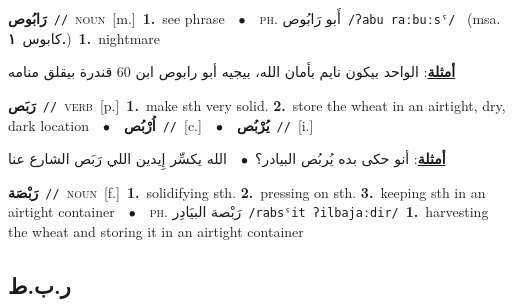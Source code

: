 \documentclass[10pt,a4paper,twoside]{article} %
\begin{document}
\begin{multicols}{2}
{\setlength\topsep{0pt}\textbf{\foreignlanguage{arabic}{رَابُوص}}\ {\color{gray}\texttt{//}\color{black}}\ \textsc{noun}\ [m.]\ \textbf{1.}~see phrase\ \ $\bullet$\ \ \textsc{ph.} \color{gray} \foreignlanguage{arabic}{أَبو رَابُوص}\color{black}\ {\color{gray}\texttt{/{\sffamily ʔabu raːbuːsˤ}/}\color{black}}\ \color{gray} (msa. \foreignlanguage{arabic}{كابوس}~\foreignlanguage{arabic}{\textbf{١.}})\color{black}\ \textbf{1.}~nightmare\  \begin{flushright}\color{gray}\foreignlanguage{arabic}{\textbf{\underline{\foreignlanguage{arabic}{أمثلة}}}: الواحد بيكون نايم بأمان الله، بيجيه أبو رابوص ابن 60 قندرة بيقلق منامه}\end{flushright}\color{black}} \vspace{2mm}

{\setlength\topsep{0pt}\textbf{\foreignlanguage{arabic}{رَبَص}}\ {\color{gray}\texttt{//}\color{black}}\ \textsc{verb}\ [p.]\ \textbf{1.}~make sth very solid.  \textbf{2.}~store the wheat in an airtight, dry, dark location\ \ $\bullet$\ \ \setlength\topsep{0pt}\textbf{\foreignlanguage{arabic}{اُرْبُص}}\ {\color{gray}\texttt{//}\color{black}}\ [c.]\ \ $\bullet$\ \ \setlength\topsep{0pt}\textbf{\foreignlanguage{arabic}{يُرْبُص}}\ {\color{gray}\texttt{//}\color{black}}\ [i.]\  \begin{flushright}\color{gray}\foreignlanguage{arabic}{\textbf{\underline{\foreignlanguage{arabic}{أمثلة}}}: أنو حكى بده يُربُص البيادر؟\ $\bullet$\ \  الله يكسِّر إِيدين اللي رَبَص الشارع عنا}\end{flushright}\color{black}} \vspace{2mm}

{\setlength\topsep{0pt}\textbf{\foreignlanguage{arabic}{رَبْصَة}}\ {\color{gray}\texttt{//}\color{black}}\ \textsc{noun}\ [f.]\ \textbf{1.}~solidifying sth.  \textbf{2.}~pressing on sth.  \textbf{3.}~keeping sth in an airtight container\ \ $\bullet$\ \ \textsc{ph.} \color{gray} \foreignlanguage{arabic}{رَبْصة البيَادِر}\color{black}\ {\color{gray}\texttt{/{\sffamily rabsˤit ʔilbajaːdir}/}\color{black}}\ \textbf{1.}~harvesting the wheat and storing it in an airtight container\ } \vspace{2mm}

\vspace{-3mm}
\subsection*{\color{blue}\foreignlanguage{arabic}{ر.ب.ط}\color{blue}{}} 


\end{multicols}
\end{document}
